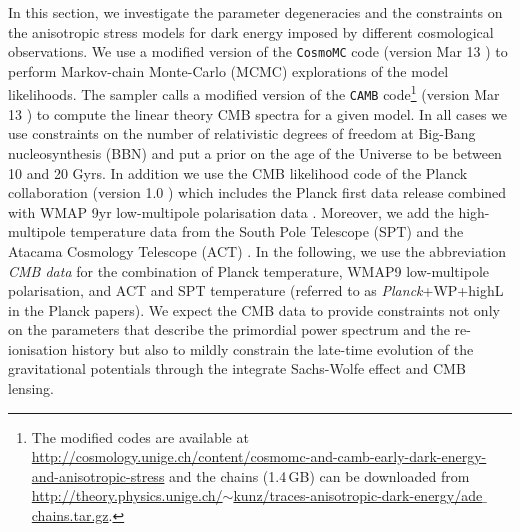 In this section, we investigate the parameter degeneracies and the constraints on the anisotropic stress models for dark energy imposed by different cosmological observations. We use a modified version of the {\tt CosmoMC} code (version Mar 13 \cite{Lewis:2002ah,Cosmomc}) to perform Markov-chain Monte-Carlo (MCMC) explorations of the model likelihoods. The sampler calls a modified version of the {\tt CAMB} code\footnote{The modified codes are available at \href{http://cosmology.unige.ch/content/cosmomc-and-camb-early-dark-energy-and-anisotropic-stress}{http://cosmology.unige.ch/content/cosmomc-and-camb-early-dark-energy-and-anisotropic-stress} and the chains (1.4\,GB) can be downloaded from \href{http://theory.physics.unige.ch/~kunz/traces-anisotropic-dark-energy/ade_chains.tar.gz}{http://theory.physics.unige.ch/$ \sim $kunz/traces-anisotropic-dark-energy/ade$\_$chains.tar.gz}.} (version Mar 13 \cite{Lewis:1999bs,Camb}) to compute the linear theory CMB spectra for a given model. 
In all cases we use constraints on the number of relativistic degrees of freedom at Big-Bang nucleosynthesis (BBN) \cite{Pisanti:2007hk} and put a prior on the age of the Universe to be between 10 and 20 Gyrs. In addition we use the CMB likelihood code of the Planck collaboration (version 1.0 \cite{Planck:2013kta,Ade:2013zuv}) which includes the Planck first data release combined with WMAP 9yr low-multipole polarisation data \cite{Bennett:2012fp}. Moreover, we add the high-multipole temperature data from the South Pole Telescope (SPT) \cite{Story:2012wx} and the Atacama Cosmology Telescope (ACT) \cite{Das:2013zf}. In the following, we use the abbreviation \emph{CMB data} for the combination of Planck temperature, WMAP9 low-multipole polarisation, and ACT and SPT temperature  (referred to as \emph{Planck}+WP+highL in the Planck papers). We expect the CMB data to provide constraints not only on the parameters that describe the primordial power spectrum and the re-ionisation history but also to mildly constrain the late-time evolution of the gravitational potentials through the integrate Sachs-Wolfe effect and CMB lensing. 


